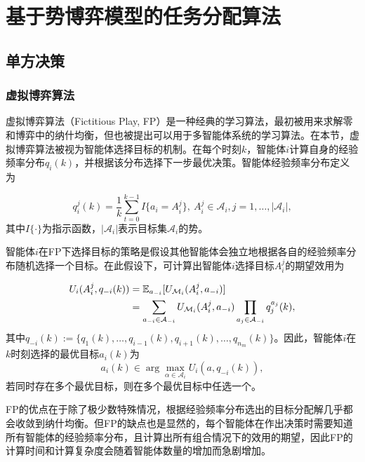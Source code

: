 \section{基于势博弈模型的任务分配算法}
\label{pg:pgta}
\subsection{单方决策}
\label{pg:pgta:protocal}

\subsubsection{虚拟博弈算法}
\label{pgta:protocal:FP}
虚拟博弈算法（Fictitious Play, FP）是一种经典的学习算法，最初被用来求解零和博弈中的纳什均衡，但也被提出可以用于多智能体系统的学习算法。在本节，虚拟博弈算法被视为智能体选择目标的机制。在每个时刻$k$，智能体$i$计算自身的经验频率分布$q_i(k)$，并根据该分布选择下一步最优决策。智能体经验频率分布定义为

\begin{equation}
\label{pg:eq:frequency}
	q_i^j(k) = \frac{1}{k} \sum_{t=0}^{k-1} I\{a_i = A_i^j\},\ A_i^j \in \mathcal{A}_i, j = 1,\dots,|\mathcal{A}_i|,
\end{equation}
其中$I\{\cdot\}$为指示函数，$|\mathcal{A}_i|$表示目标集$\mathcal{A}_i$的势。

智能体$i$在FP下选择目标的策略是假设其他智能体会独立地根据各自的经验频率分布随机选择一个目标。在此假设下，可计算出智能体$i$选择目标$A_i^j$的期望效用为

\begin{align}
\label{pg:eq:expectU}
	U_i(A_i^j, q_{-i}(k)) &= \mathbb{E}_{a_{-i}}[U_{\mathcal{M}_i}(A_i^j,a_{-i})]\notag\\
	&= \sum_{a_{-i}\in \mathcal{A}_{-i}} U_{\mathcal{M}_i}(A_i^j, a_{-i}) \prod_{a_j \in \mathcal{A}_{-i}} q_j^{a_j}(k),
\end{align}
其中$q_{-i}(k):=\{q_1(k),\dots,q_{i-1}(k),q_{i+1}(k),\dots,q_{n_m}(k)\}$。因此，智能体$i$在$k$时刻选择的最优目标$a_i(k)$为
\begin{equation}
\label{pg:eq:bestResponse}
	a_i(k) \in \arg \max_{\alpha \in \mathcal{A}_i} U_i(a, q_{-i}(k)),
\end{equation}
若同时存在多个最优目标，则在多个最优目标中任选一个。

FP的优点在于除了极少数特殊情况，根据经验频率分布选出的目标分配解几乎都会收敛到纳什均衡。但FP的缺点也是显然的，每个智能体在作出决策时需要知道所有智能体的经验频率分布，且计算出所有组合情况下的效用的期望，因此FP的计算时间和计算复杂度会随着智能体数量的增加而急剧增加。

